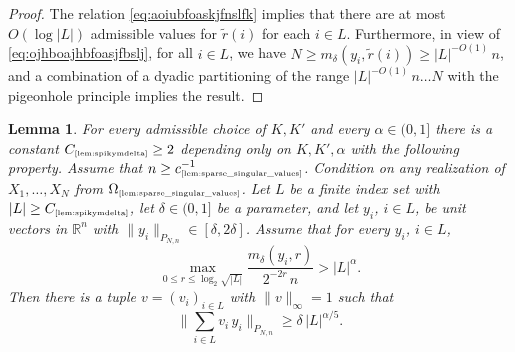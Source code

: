 \documentclass[11pt]{amsart}
\newtheorem{lemma}[theorem]{Lemma}
\theoremstyle{definition}
\theoremstyle{plain}
\newcommand{\R}{\mathbb{R}}
\def\R{{\mathbb R}}
\begin{document}
\begin{proof}
The relation \eqref{eq:aoiubfoaskjfnslfk}
implies that there are at most $O(\log |L|)$
admissible values for $\tilde r(i)$ for each $i\in L$.
Furthermore, in view of \eqref{eq:ojhboajhbfoasjfbslj},
for all $i\in L$, we have
$N\geq m_\delta(y_i,\tilde r(i))\geq |L|^{-O(1)}\,n$,
and a combination of a dyadic partitioning 
of the range $|L|^{-O(1)}\,n\dots N$
with the pigeonhole principle
implies the result.
\end{proof}
















\begin{lemma}\label{lem:spikymdelta}
For every admissible choice of $K,K'$
and every $\alpha\in(0,1]$
there is a constant
$C_{\text{\tiny\ref{lem:spikymdelta}}}\geq 2$
depending only on $K,K',\alpha$
with the following property.
Assume that $n\geq c_{\text{\tiny\ref{lem:sparse_singular_values}}}^{-1}$.
Condition on 
any realization of $X_1,\dots,X_N$
from $\Omega_{\text{\tiny\ref{lem:sparse_singular_values}}}$.
Let $L$ be a finite index set
with $|L|\geq C_{\text{\tiny\ref{lem:spikymdelta}}}$,
let $\delta\in(0,1]$ be a parameter,
and let $y_i$, $i\in L$, be
unit vectors in $\R^n$ with $\|y_i\|_{P_{N,n}}\in [\delta,2\delta]$.
Assume that 
for every $y_i$, $i\in L$,
$$
\max\limits_{0\leq r\leq \log_2 \sqrt{|L|}}
\frac{m_\delta(y_i,r)}{2^{-2r}\,n}
>
|L|^{\alpha}.
$$
Then there is a tuple $v=(v_i)_{i\in L}$ with $\|v\|_\infty=1$
such that
$$
\Big\|\sum_{i\in L}v_i\,y_i\Big\|_{P_{N,n}}
\geq \delta\,|L|^{\alpha/5}.
$$
\end{lemma}
\end{document}
